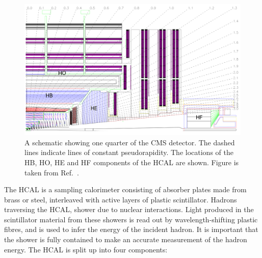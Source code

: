 \begin{figure}[htb!]
  \centering
  \includegraphics[width=.9\textwidth]{Figures/cms/hcal.pdf}
  \caption[The CMS hadronic calorimeter]
  {
    A schematic showing one quarter of the CMS detector. The dashed lines indicate lines of constant pseudorapidity. The locations of the HB, HO, HE and HF components of the HCAL are shown. Figure is taken from Ref.~\cite{Chatrchyan:2008zzk}.
  }
  \label{fig:cms_hcal}
\end{figure}

The HCAL is a sampling calorimeter consisting of absorber plates made from brass or steel, interleaved with active layers of plastic scintillator. Hadrons traversing the HCAL, shower due to nuclear interactions. Light produced in the scintillator material from these showers is read out by wavelength-shifting plastic fibres, and is used to infer the energy of the incident hadron. It is important that the shower is fully contained to make an accurate measurement of the hadron energy. The HCAL is split up into four components:

